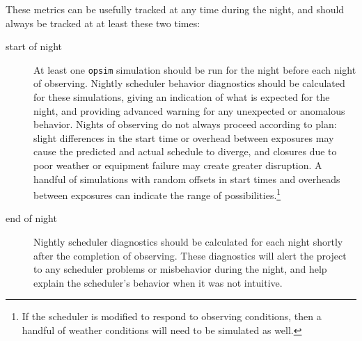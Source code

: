 These metrics can be usefully tracked at any time during the night, and should always be tracked at at least these two times:
\begin{description}
\item[{start of night}] At least one \texttt{opsim} simulation should be run for the night before each night of observing. Nightly scheduler behavior diagnostics should be calculated for these simulations, giving an indication of what is expected for the night, and providing advanced warning for any unexpected or anomalous behavior. Nights of observing do not always proceed according to plan: slight differences in the start time or overhead between exposures may cause the predicted and actual schedule to diverge, and closures due to poor weather or equipment failure may create greater disruption. A handful of simulations with random offsets in start times and overheads between exposures can indicate the range of possibilities.\footnote{If the scheduler is modified to respond to observing conditions, then a handful of weather conditions will need to be simulated as well.}
\item[{end of night}] Nightly scheduler diagnostics should be calculated for each night shortly after the completion of observing. These diagnostics will alert the project to any scheduler problems or misbehavior during the night, and help explain the scheduler's behavior when it was not intuitive.
\end{description}

